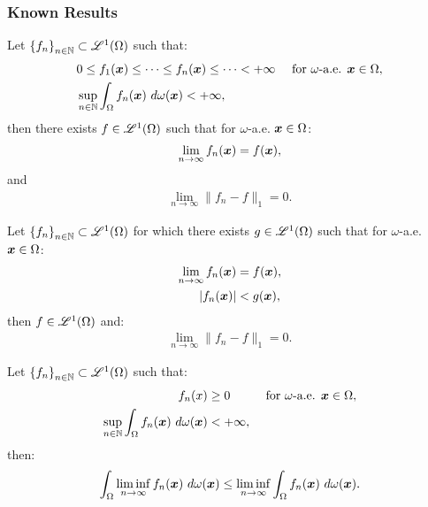 \subsubsection{Known Results}

\begin{theorem}
    Let $\left\{ f_n \right\}_{n \in \mathbb{N}} \subset \mathscr{L}^{1}(\Omega)$ such that:
    \begin{align}
        & 0 \leq f_1(\bm{x}) \leq \dots \leq f_n(\bm{x}) \leq \dots < +\infty &\text{ for } \omega \text{-a.e. } \bm{x} \in \Omega, \\
        & \sup_{n \in \mathbb{N}} \int_\Omega f_n(\bm{x}) ~ d \omega(\bm{x}) < +\infty,
    \end{align}
    then there exists $f \in \mathscr{L}^{1}(\Omega)$ such that for $\omega$-a.e. $\bm{x} \in \Omega$:
    \begin{align}
        \lim_{n \rightarrow \infty} f_n(\bm{x}) = f(\bm{x}),
    \end{align}
    and
    \begin{align}
        \lim_{n \rightarrow \infty} \lVert f_n - f \rVert_1 = 0.
    \end{align}
\end{theorem}

\begin{theorem}
    Let $\left\{ f_n \right\}_{n \in \mathbb{N}} \subset \mathscr{L}^{1}(\Omega)$ for which there exists $g \in \mathscr{L}^{1}(\Omega)$ such that for $\omega$-a.e. $\bm{x} \in \Omega$:
    \begin{align}
        \lim_{n \rightarrow \infty} f_n(\bm{x}) & = f(\bm{x}), \\
        \lvert f_n(\bm{x}) \rvert & < g(\bm{x}),
    \end{align}
    then $f \in \mathscr{L}^{1}(\Omega)$ and:
    \begin{align}
        \lim_{n \rightarrow \infty} \lVert f_n - f \rVert_1 = 0.
    \end{align}
\end{theorem}

\begin{lemma}[Fatou]
    Let $\left\{ f_n \right\}_{n \in \mathbb{N}} \subset \mathscr{L}^{1}(\Omega)$ such that:
    \begin{align}
        f_n(x) & \geq 0 &\text{ for } \omega \text{-a.e. } \bm{x} \in \Omega, \\
        \sup_{n \in \mathbb{N}} \int_{\Omega} f_n(\bm{x}) ~ d \omega(\bm{x}) & < +\infty,
    \end{align}
    then:
    \begin{align}
        \int_{\Omega} \liminf_{n \rightarrow \infty} f_n(\bm{x}) ~ d \omega(\bm{x}) \leq \liminf_{n \rightarrow \infty} \int_{\Omega} f_n(\bm{x}) ~ d \omega(\bm{x}).
    \end{align}
\end{lemma}

